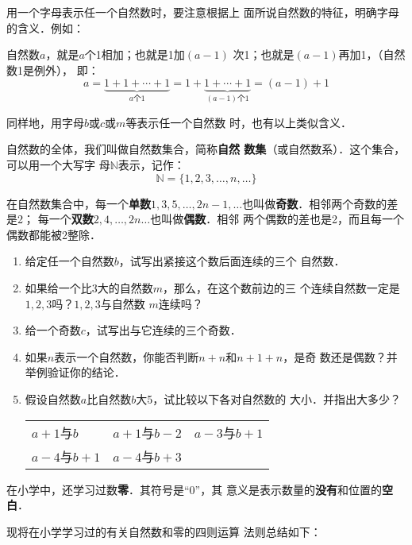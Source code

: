 用一个字母表示任一个自然数时，要注意根据上
面所说自然数的特征，明确字母的含义．例如：

自然数$a$，就是$a$个1相加；也就是1加$(a- 1)$
次1；也就是$(a-1)$再加1，（自然数1是例外），
即：
\[a=\underbrace{1+1+\cdots+1}_{a\text{个} 1}=1+\underbrace{1+\cdots+1}_{(a-1)\text{个} 1} = (a-1)+1\]

同样地，用字母$b$或$c$或$m$等表示任一个自然数
时，也有以上类似含义．

自然数的全体，我们叫做自然数集合，简称\textbf{自然
	数集}（或自然数系）．这个集合，可以用一个大写字
母$\mathbb{N}$表示，记作：
\[\mathbb{N}=\{1,2,3,\ldots,n,\ldots \} \]

在自然数集合中，每一个\textbf{单数}$1, 3, 5,\ldots, 2n-1,\ldots$也叫做\textbf{奇数}．相邻两个奇数的差是2；
每一个\textbf{双数}$2 ,  4 , \ldots,  2n\ldots$也叫做\textbf{偶数}．相邻
两个偶数的差也是2，而且每一个偶数都能被2整除．

\begin{ex}
	\begin{enumerate}
		\item  给定任一个自然数$b$，试写出紧接这个数后面连续的三个
		自然数．
		\item  如果给一个比3大的自然数$m$，那么，在这个数前边的三
		个连续自然数一定是$1,  2,  3$吗？$1,  2,  3$与自然数
		$m$连续吗？
		\item  给一个奇数$c$，试写出与它连续的三个奇数．
		\item  如果$n$表示一个自然数，你能否判断$n+n$和$n+1+n$，是奇
		数还是偶数？并举例验证你的结论．
		\item 假设自然数$a$比自然数$b$大5，试比较以下各对自然数的
		大小．并指出大多少？
		\begin{center}
			\begin{tabular}{p{.2\textwidth}p{}p{}}
				$a+1$与$b$&
				$a + 1$与$b-2$&
				$a-3$与$b + 1$\\
				$a-4$与$b+1$&
				$a-4$与$b+ 3$\\
			\end{tabular}
		\end{center}
		
	\end{enumerate}  
\end{ex}

在小学中，还学习过数\textbf{零}．其符号是“0”，其
意义是表示数量的\textbf{没有}和位置的\textbf{空白}．

现将在小学学习过的有关自然数和零的四则运算
法则总结如下：

